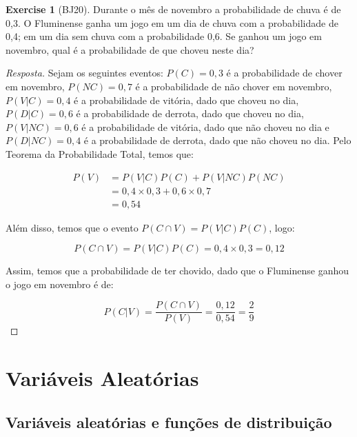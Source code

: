 \documentclass[
]{article}
\theoremstyle{definition}
\theoremstyle{definition}
\theoremstyle{definition}
\newtheorem{exercise}{Exercise}[section]
\theoremstyle{definition}
\theoremstyle{remark}
\begin{document}
\begin{exercise}[BJ20]

Durante o mês de novembro a probabilidade de chuva é de 0,3. O Fluminense ganha um jogo em um dia de chuva com a probabilidade de 0,4; em um dia sem chuva com a probabilidade 0,6. Se ganhou um jogo em novembro, qual é a probabilidade de que choveu neste dia?

\begin{proof}[Resposta]
Sejam os seguintes eventos: \(P(C) = 0,3\) é a probabilidade de chover em novembro, \(P(NC) = 0,7\) é a probabilidade de não chover em novembro, \(P(V|C) = 0,4\) é a probabilidade de vitória, dado que choveu no dia, \(P(D|C) = 0,6\) é a probabilidade de derrota, dado que choveu no dia, \(P(V|NC) = 0,6\) é a probabilidade de vitória, dado que não choveu no dia e \(P(D|NC) = 0,4\) é a probabilidade de derrota, dado que não choveu no dia. Pelo Teorema da Probabilidade Total, temos que:

\begin{align*}
P(V) &= P(V|C)P(C) + P(V|NC)P(NC) \\
&= 0,4 \times 0,3 + 0,6 \times 0,7 \\
&= 0,54
\end{align*}

Além disso, temos que o evento \(P(C \cap V) = P(V|C)P(C)\), logo:

\begin{equation*}
P(C \cap V) = P(V|C)P(C) = 0,4 \times 0,3 = 0,12
\end{equation*}

Assim, temos que a probabilidade de ter chovido, dado que o Fluminense ganhou o jogo em novembro é de:

\begin{equation*}
P(C|V) = \frac{P(C \cap V)}{P(V)} = \frac{0,12}{0,54} = \frac{2}{9}
\end{equation*}
\end{proof}

\end{exercise}

\newpage

\hypertarget{variuxe1veis-aleatuxf3rias}{%
\section{Variáveis Aleatórias}\label{variuxe1veis-aleatuxf3rias}}

\hypertarget{variuxe1veis-aleatuxf3rias-e-funuxe7uxf5es-de-distribuiuxe7uxe3o}{%
\subsection{Variáveis aleatórias e funções de distribuição}\label{variuxe1veis-aleatuxf3rias-e-funuxe7uxf5es-de-distribuiuxe7uxe3o}}
\end{document}
